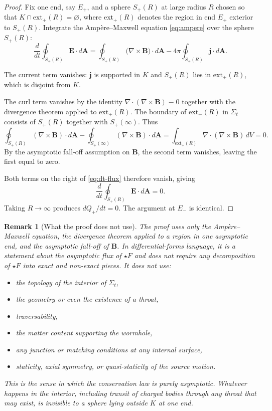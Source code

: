 \documentclass[aps,prd,onecolumn,nofootinbib,superscriptaddress]{revtex4-2}
\newtheorem{remark}{Remark}
\begin{document}
\begin{proof}
Fix one end, say $E_+$, and a sphere $S_+(R)$ at large radius $R$ chosen so that $K \cap \mathrm{ext}_+(R) = \varnothing$, where $\mathrm{ext}_+(R)$ denotes the region in end $E_+$ exterior to $S_+(R)$. Integrate the Amp\`ere--Maxwell equation \eqref{eq:ampere} over the sphere $S_+(R)$:
\begin{equation}
\label{eq:dt-flux}
\frac{d}{dt}\oint_{S_+(R)} \bm{E}\cdot d\bm{A}
= \oint_{S_+(R)} \big(\nabla\times \bm{B}\big)\cdot d\bm{A}
- 4\pi \oint_{S_+(R)} \bm{j}\cdot d\bm{A}.
\end{equation}

The current term vanishes: $\bm{j}$ is supported in $K$ and $S_+(R)$ lies in $\mathrm{ext}_+(R)$, which is disjoint from $K$.

The curl term vanishes by the identity $\nabla\cdot(\nabla\times\bm{B})\equiv 0$ together with the divergence theorem applied to $\mathrm{ext}_+(R)$. The boundary of $\mathrm{ext}_+(R)$ in $\Sigma_t$ consists of $S_+(R)$ together with $S_+(\infty)$. Thus
\begin{equation}
\oint_{S_+(R)}(\nabla\times\bm{B})\cdot d\bm{A}
- \oint_{S_+(\infty)}(\nabla\times\bm{B})\cdot d\bm{A}
= \int_{\mathrm{ext}_+(R)} \nabla\cdot(\nabla\times\bm{B})\, dV = 0.
\end{equation}
By the asymptotic fall-off assumption on $\bm{B}$, the second term vanishes, leaving the first equal to zero.

Both terms on the right of \eqref{eq:dt-flux} therefore vanish, giving
\begin{equation}
\frac{d}{dt}\oint_{S_+(R)} \bm{E}\cdot d\bm{A} = 0.
\end{equation}
Taking $R\to\infty$ produces $dQ_+/dt = 0$. The argument at $E_-$ is identical.
\end{proof}

\begin{remark}[What the proof does not use]
The proof uses only the Amp\`ere--Maxwell equation, the divergence theorem applied to a region in one asymptotic end, and the asymptotic fall-off of $\bm{B}$. In differential-forms language, it is a statement about the asymptotic flux of $\star F$ and does not require any decomposition of $\star F$ into exact and non-exact pieces. It does \emph{not} use:
\begin{itemize}
    \item the topology of the interior of $\Sigma_t$,
    \item the geometry or even the existence of a throat,
    \item traversability,
    \item the matter content supporting the wormhole,
    \item any junction or matching conditions at any internal surface,
    \item staticity, axial symmetry, or quasi-staticity of the source motion.
\end{itemize}
This is the sense in which the conservation law is purely asymptotic. Whatever happens in the interior, including transit of charged bodies through any throat that may exist, is invisible to a sphere lying outside $K$ at one end.
\end{remark}
\end{document}
